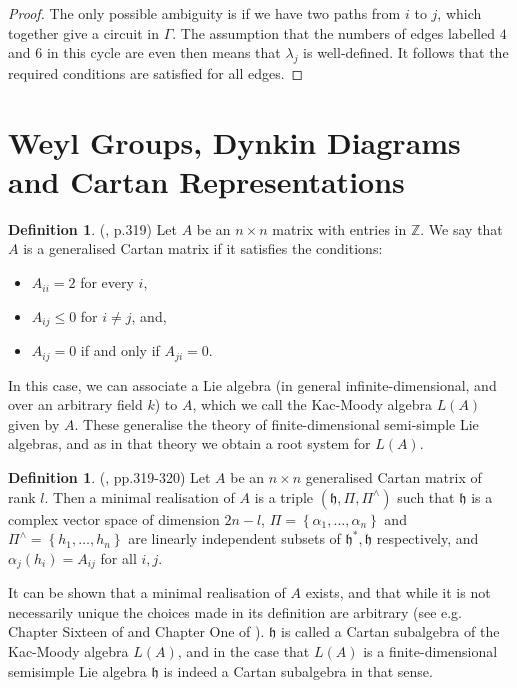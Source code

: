 \documentclass[11pt,a4paper]{report}
\theoremstyle{definition}
\newtheorem{definition}[theorem]{Definition}
\begin{document}
\begin{proof}
The only possible ambiguity is if we have two paths from $i$ to $j$, which together give a circuit in $\Gamma$. The assumption that the numbers of edges labelled $4$ and $6$ in this cycle are even then means that $\lambda_j$ is well-defined. It follows that the required conditions are satisfied for all edges. 
\end{proof}
\section{Weyl Groups, Dynkin Diagrams and Cartan Representations}

\begin{definition} (\cite{Carter}, p.319) Let $A$ be an $n \times n$ matrix with entries in $\mathbb{Z}$. We say that $A$ is a generalised Cartan matrix if it satisfies the conditions: 
\begin{itemize}
 \item $A_{ii} = 2$ for every $i$,
 \item $A_{ij} \leq 0$ for $i \neq j$, and,
 \item $A_{ij} = 0$ if and only if $A_{ji} = 0$.
 \end{itemize}
\end{definition}
In this case, we can associate a Lie algebra (in general infinite-dimensional, and over an arbitrary field $k$) to $A$, which we call the Kac-Moody algebra $L(A)$ given by $A$. These generalise the theory of finite-dimensional semi-simple Lie algebras, and as in that theory we obtain a root system for $L(A)$. 

\begin{definition} (\cite{Carter}, pp.319-320) Let $A$ be an $n \times n$ generalised Cartan matrix of rank $l$. Then a minimal realisation of $A$ is a triple $(\mathfrak{h}, \Pi, \Pi^\wedge)$ such that $\mathfrak{h}$ is a complex vector space of dimension $2n - l$, $\Pi = \left\{\alpha_1, \ldots, \alpha_n\right\}$ and $\Pi^\wedge = \left\{h_1, \ldots, h_n\right\}$ are linearly independent subsets of $\mathfrak{h}^*, \mathfrak{h}$ respectively, and $\alpha_j(h_i) = A_{ij}$ for all $i, j$.\end{definition}

It can be shown that a minimal realisation of $A$ exists, and that while it is not necessarily unique the choices made in its definition are arbitrary (see e.g. Chapter Sixteen of \cite{Carter} and Chapter One of \cite{Kac}). $\mathfrak{h}$ is called a Cartan subalgebra of the Kac-Moody algebra $L(A)$, and in the case that $L(A)$ is a finite-dimensional semisimple Lie algebra $\mathfrak{h}$ is indeed a Cartan subalgebra in that sense. 
\end{document}
